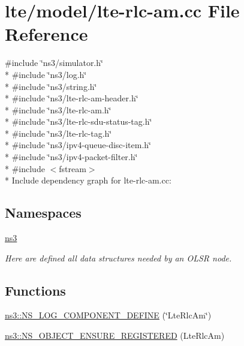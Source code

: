 \hypertarget{lte-rlc-am_8cc}{}\section{lte/model/lte-\/rlc-\/am.cc File Reference}
\label{lte-rlc-am_8cc}
{\ttfamily \#include \char`\"{}ns3/simulator.\+h\char`\"{}}\\*
{\ttfamily \#include \char`\"{}ns3/log.\+h\char`\"{}}\\*
{\ttfamily \#include \char`\"{}ns3/string.\+h\char`\"{}}\\*
{\ttfamily \#include \char`\"{}ns3/lte-\/rlc-\/am-\/header.\+h\char`\"{}}\\*
{\ttfamily \#include \char`\"{}ns3/lte-\/rlc-\/am.\+h\char`\"{}}\\*
{\ttfamily \#include \char`\"{}ns3/lte-\/rlc-\/sdu-\/status-\/tag.\+h\char`\"{}}\\*
{\ttfamily \#include \char`\"{}ns3/lte-\/rlc-\/tag.\+h\char`\"{}}\\*
{\ttfamily \#include \char`\"{}ns3/ipv4-\/queue-\/disc-\/item.\+h\char`\"{}}\\*
{\ttfamily \#include \char`\"{}ns3/ipv4-\/packet-\/filter.\+h\char`\"{}}\\*
{\ttfamily \#include $<$fstream$>$}\\*
Include dependency graph for lte-\/rlc-\/am.cc\+:
\subsection*{Namespaces}
\begin{DoxyCompactItemize}
\item 
 \hyperlink{namespacens3}{ns3}
\begin{DoxyCompactList}\small\item\em Here are defined all data structures needed by an O\+L\+SR node. \end{DoxyCompactList}\end{DoxyCompactItemize}
\subsection*{Functions}
\begin{DoxyCompactItemize}
\item 
\hyperlink{namespacens3_a919546a1e4a111b834703975e30c7101}{ns3\+::\+N\+S\+\_\+\+L\+O\+G\+\_\+\+C\+O\+M\+P\+O\+N\+E\+N\+T\+\_\+\+D\+E\+F\+I\+NE} (\char`\"{}Lte\+Rlc\+Am\char`\"{})
\item 
\hyperlink{namespacens3_a820cbe3050aa12ba4c75fd9581bf7d48}{ns3\+::\+N\+S\+\_\+\+O\+B\+J\+E\+C\+T\+\_\+\+E\+N\+S\+U\+R\+E\+\_\+\+R\+E\+G\+I\+S\+T\+E\+R\+ED} (Lte\+Rlc\+Am)
\end{DoxyCompactItemize}
